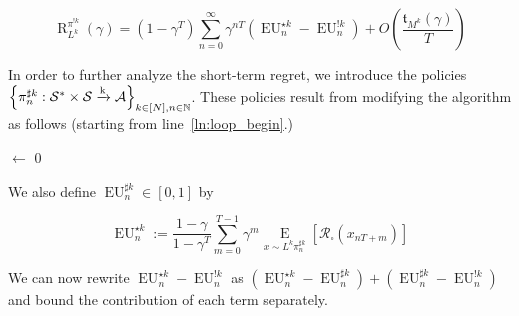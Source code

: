 \documentclass[anon,12pt]{colt2018} %
\newcommand{\AP}[1]{\left(#1\right)}
\newcommand{\AB}[1]{\left[#1\right]}
\newcommand{\AC}[1]{\left\{#1\right\}}
\newcommand{\Ea}[2]{\underset{#1}{\operatorname{E}}\AB{#2}}
\newcommand{\Nats}{\mathbb{N}}
\newcommand{\K}{\xrightarrow{\textnormal{k}}}
\newcommand{\A}{\mathcal{A}}
\newcommand{\St}{\mathcal{S}}
\newcommand{\R}{\mathcal{R}}
\newcommand{\EU}{\operatorname{EU}}
\newcommand{\Rg}{\operatorname{R}}
\newcommand{\MP}[2]{#1#2}
\newcommand{\Tn}{\mathfrak{t}}
\newcommand{\IP}{\pi^{!k}}
\begin{document}
\begin{equation}
\label{eqn:short_long_decomposition}
\Rg_{L^k}^{\IP}(\gamma) = \AP{1-\gamma^T}\sum_{n=0}^\infty \gamma^{nT}\AP{\EU^{\star k}_n-\EU^{!k}_n}+O\AP{\frac{\Tn_{M^k}(\gamma)}{T}}
\end{equation}

In order to further analyze the short-term regret, we introduce the policies\\$\AC{\pi_n^{\sharp k}: \St^* \times \St \K \A}_{k \in [N],n \in \Nats}$. These policies result from modifying the algorithm as follows (starting from line~\ref{ln:loop_begin}.)

\begin{algorithm}[h]

\setcounter{AlgoLine}{2}


\Counter$\leftarrow$ 0\;


\end{algorithm}

We also define $\EU^{\sharp k}_n\in[0,1]$ by

\begin{equation}
\EU_n^{\star k}:=\frac{1-\gamma}{1-\gamma^T}\sum_{m=0}^{T-1} \gamma^m \Ea{x\sim{\MP{L^k}{\pi_n^{\sharp  k}}}}{\R_\square\AP{x_{nT+m}}}
\end{equation}

We can now rewrite $\EU^{\star k}_n-\EU^{!k}_n$ as $\AP{\EU^{\star k}_n-\EU^{\sharp k}_n}+\AP{\EU^{\sharp k}_n-\EU^{!k}_n}$ and bound the contribution of each term separately.
\end{document}

